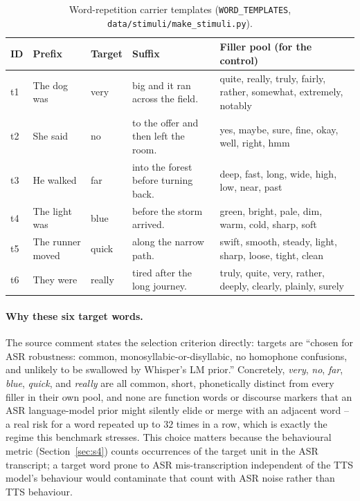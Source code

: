 \documentclass[11pt]{article}
\begin{document}
\begin{table}[h]
\centering
\caption{Word-repetition carrier templates (\texttt{WORD\_TEMPLATES},
\texttt{data/stimuli/make\_stimuli.py}).}
\label{tab:templates}
\small
\begin{tabular}{@{}lp{2.6cm}p{1.3cm}p{3.0cm}p{5.0cm}@{}}
\toprule
ID & Prefix & Target & Suffix & Filler pool (for the control) \\
\midrule
t1 & The dog was & very & big and it ran across the field. & quite, really, truly, fairly, rather, somewhat, extremely, notably \\
t2 & She said & no & to the offer and then left the room. & yes, maybe, sure, fine, okay, well, right, hmm \\
t3 & He walked & far & into the forest before turning back. & deep, fast, long, wide, high, low, near, past \\
t4 & The light was & blue & before the storm arrived. & green, bright, pale, dim, warm, cold, sharp, soft \\
t5 & The runner moved & quick & along the narrow path. & swift, smooth, steady, light, sharp, loose, tight, clean \\
t6 & They were & really & tired after the long journey. & truly, quite, very, rather, deeply, clearly, plainly, surely \\
\bottomrule
\end{tabular}
\end{table}

\paragraph{Why these six target words.} The source comment states the
selection criterion directly: targets are ``chosen for ASR robustness:
common, monosyllabic-or-disyllabic, no homophone confusions, and unlikely to
be swallowed by Whisper's LM prior.'' Concretely, \emph{very}, \emph{no},
\emph{far}, \emph{blue}, \emph{quick}, and \emph{really} are all common,
short, phonetically distinct from every filler in their own pool, and none
are function words or discourse markers that an ASR language-model prior
might silently elide or merge with an adjacent word -- a real risk for a word
repeated up to $32$ times in a row, which is exactly the regime this
benchmark stresses. This choice matters because the behavioural metric
(Section~\ref{sec:s4}) counts occurrences of the target unit in the ASR
transcript; a target word prone to ASR mis-transcription independent of the
TTS model's behaviour would contaminate that count with ASR noise rather than
TTS behaviour.
\end{document}
